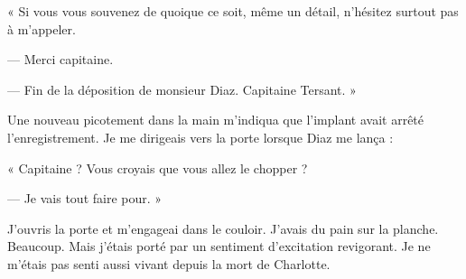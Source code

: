 « Si vous vous souvenez de quoique ce soit, même un détail, n'hésitez surtout pas à m'appeler.

— Merci capitaine.

— Fin de la déposition de monsieur Diaz. Capitaine Tersant. »

Une nouveau picotement dans la main m'indiqua que l'implant avait arrêté l'enregistrement. Je me dirigeais vers la
porte lorsque Diaz me lança :

« Capitaine ? Vous croyais que vous allez le chopper ?

— Je vais tout faire pour. »

J'ouvris la porte et m'engageai dans le couloir. J'avais du pain sur la planche. Beaucoup. Mais j'étais porté par un 
sentiment d'excitation revigorant. Je ne m'étais pas senti aussi vivant depuis la mort de Charlotte.